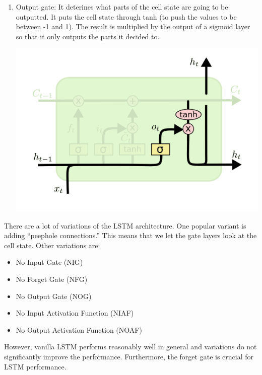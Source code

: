 \begin{enumerate}
    \item Output gate: It deterines what parts of the cell state are going to be outputted. It puts the cell state through tanh (to push the values to be between -1 and 1). The result is multiplied by the output of a sigmoid layer so that it only outputs the parts it decided to.
    \begin{center}
        \includegraphics[]{images/output-gate.png}
    \end{center}
\end{enumerate}
There are a lot of variations of the LSTM architecture. One popular variant is adding “peephole connections.” This means that we let the gate layers look at the cell state. Other variations are:
\begin{itemize}
    \item No Input Gate (NIG)
    \item No Forget Gate (NFG)
    \item No Output Gate (NOG)
    \item No Input Activation Function (NIAF)
    \item No Output Activation Function (NOAF)
\end{itemize}
However, vanilla LSTM performs reasonably well in general and variations do not significantly improve the performance. Furthermore, the forget gate is crucial for LSTM performance.

